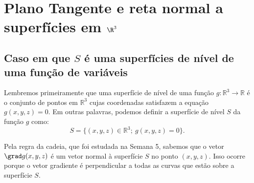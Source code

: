 \setcounter{chapter}{5}

\chapter{Plano Tangente e reta normal a superfícies em $\R^3$}


\section{Caso em que $S$ é uma superfícies de nível de uma função de  variáveis}


Lembremos primeiramente que uma superfície de nível de uma função \(g:\mathbb{R}^3\rightarrow\mathbb{R}\) é o conjunto de pontos em \(\mathbb{R}^3\) cujas coordenadas satisfazem a equação \(g(x,y,z)=0\). Em outras palavras, podemos definir a superfície de nível \(S\) da função \(g\) como:
\[S=\{(x,y,z)\in\mathbb{R}^3;~g(x,y,z)=0\}.\]

Pela regra da cadeia, que foi estudada na Semana 5, sabemos que o vetor \(\grad g(x,y,z)\) é um vetor normal à superfície \(S\) no ponto \((x,y,z)\). Isso ocorre porque o vetor gradiente é perpendicular a todas as curvas que estão sobre a superfície \(S\).

